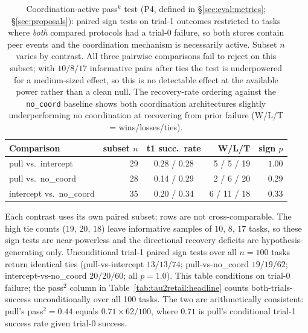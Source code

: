 \begin{table}[t]
\centering
\caption{Coordination-active pass$^k$ test (P4, defined in \S\ref{sec:eval:metrics};
\S\ref{sec:proposals}): paired sign tests on trial-1 outcomes
restricted to tasks where \emph{both} compared protocols had a
trial-0 failure, so both stores contain peer events and the
coordination mechanism is necessarily active.  Subset $n$ varies
by contrast.  All three pairwise comparisons fail to reject on
this subset; with $10/8/17$ informative pairs after ties the
test is underpowered for a medium-sized effect, so this is no
detectable effect at the available power rather than a clean
null.  The recovery-rate ordering against the \texttt{no\_coord}
baseline shows both coordination architectures slightly
underperforming no coordination at recovering from prior failure
(W/L/T = wins/losses/ties).}
\label{tab:tau2retail:trial1}
\small
\begin{tabular}{lrcrr}
\toprule
Comparison & subset $n$ & t1 succ.\ rate & W/L/T & sign $p$ \\
\midrule
pull vs.\ intercept & 29 & 0.28 / 0.28 & 5 / 5 / 19 & $1.00$ \\
pull vs.\ no\_coord & 28 & 0.14 / 0.29 & 2 / 6 / 20 & $0.29$ \\
intercept vs.\ no\_coord & 35 & 0.20 / 0.34 & 6 / 11 / 18 & $0.33$ \\
\bottomrule
\end{tabular}
\flushleft\footnotesize
Each contrast uses its own paired subset; rows are not
cross-comparable.  The high tie counts ($19$, $20$, $18$) leave
informative samples of $10$, $8$, $17$ tasks, so these sign
tests are near-powerless and the directional recovery deficits
are hypothesis-generating only.  Unconditional trial-1 paired
sign tests over all $n{=}100$ tasks return identical ties
(pull-vs-intercept $13/13/74$; pull-vs-no\_coord $19/19/62$;
intercept-vs-no\_coord $20/20/60$; all $p{=}1.0$).  This table
conditions on trial-0 failure; the pass$^2$ column in
Table~\ref{tab:tau2retail:headline} counts both-trials-success
unconditionally over all 100 tasks.  The two are arithmetically
consistent: pull's pass$^2{=}0.44$ equals $0.71 \times 62/100$,
where $0.71$ is pull's conditional trial-1 success rate given
trial-0 success.
\end{table}

